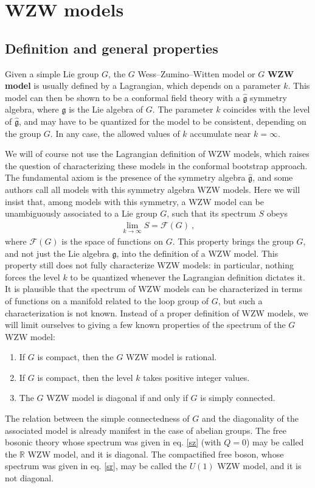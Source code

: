 \documentclass[12pt,a4paper,notitlepage]{report}
\numberwithin{equation}{section}
\theoremstyle{break}
\begin{document}
\section{WZW models}


\subsection{Definition and general properties}

Given a simple Lie group $G$, the $G$ Wess--Zumino--Witten model or $G$ \textbf{\boldmath WZW model} is usually defined by a Lagrangian, which depends on a parameter $k$.
This model can then be shown to be a conformal field theory with a $\hat{\mathfrak{g}}$ symmetry algebra, where $\mathfrak{g}$ is the Lie algebra of $G$.
The parameter $k$ coincides with the level of $\hat{\mathfrak{g}}$, and may have to be quantized for the model to be consistent, depending on the group $G$.
In any case, the allowed values of $k$ accumulate near $k=\infty$.

We will of course not use the Lagrangian definition of WZW models, which raises the question of characterizing these models in the conformal bootstrap approach.
The fundamental axiom is the presence of the symmetry algebra $\hat{\mathfrak{g}}$, and some  authors call all models with this symmetry algebra WZW models.
Here we will insist that, among models with this symmetry, 
a WZW model can be unambiguously associated to a Lie group $G$, such that its spectrum $S$ obeys
\begin{align}
 \boxed{\underset{k\rightarrow \infty}{\lim} S = \mathcal{F}(G)}\ ,
\label{lsfg}
\end{align}
where $\mathcal{F}(G)$ is the space of functions on $G$.
This property brings the group $G$, and not just the Lie algebra $\mathfrak{g}$, into the definition of a WZW model.
This property still does not fully characterize WZW models: in particular, nothing forces the level $k$ to be quantized whenever the Lagrangian definition dictates it.
It is plausible that the spectrum of WZW models can be characterized in terms of functions on a manifold related to the loop group of $G$, but such a characterization is not known.
Instead of a proper definition of WZW models, we will limit ourselves to giving a few known properties of the spectrum of the $G$ WZW model:
\begin{enumerate}
 \item If $G$ is compact, then the $G$ WZW model is rational.
\item If $G$ is compact, then the level $k$ takes positive integer values.
\item The $G$ WZW model is diagonal if and only if $G$ is simply connected. 
\end{enumerate}
The relation between the simple connectedness of $G$ and the diagonality of the associated model is already manifest in the case of abelian groups.
The free bosonic theory whose spectrum was given in eq. \eqref{sz} (with $Q=0$) may be called the ${\mathbb{R}}$ WZW model, and it is diagonal.
The compactified free boson, whose spectrum was given in eq. \eqref{sr}, may be called the $U(1)$ WZW model, and it is not diagonal. 
\end{document}
